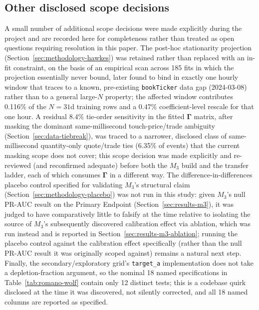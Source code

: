 \subsection{Other disclosed scope decisions}
\label{sec:limitations-other}

A small number of additional scope decisions were made explicitly during
the project and are recorded here for completeness rather than treated
as open questions requiring resolution in this paper. The post-hoc
stationarity projection (Section~\ref{sec:methodology-hawkes}) was
retained rather than replaced with an in-fit constraint, on the basis of
an empirical scan across 185 fits in which the projection essentially
never bound, later found to bind in exactly one hourly window that traces
to a known, pre-existing \texttt{bookTicker} data gap
(2024-03-08) rather than to a general large-$N$ property; the affected
window contributes 0.116\% of the $N=31$d training rows and a $0.47\%$
coefficient-level rescale for that one hour. A residual $8.4\%$
tie-order sensitivity in the fitted $\boldsymbol\Gamma$ matrix, after
masking the dominant same-millisecond touch-price/trade ambiguity
(Section~\ref{sec:data-tiebreak}), was traced to a narrower, disclosed
class of same-millisecond quantity-only quote/trade ties (6.35\% of
events) that the current masking scope does not cover; this scope
decision was made explicitly and re-reviewed (and reconfirmed adequate)
before both the $M_3$ build and the transfer ladder, each of which
consumes $\boldsymbol\Gamma$ in a different way. The difference-in-differences
placebo control specified for validating $M_3$'s structural claim
(Section~\ref{sec:methodology-placebo}) was not run in this study: given
$M_3$'s null PR-AUC result on the Primary Endpoint
(Section~\ref{sec:results-m3}), it was judged to have comparatively
little to falsify at the time relative to isolating the source of $M_3$'s
subsequently discovered calibration effect via ablation, which was run
instead and is reported in Section~\ref{sec:results-m3-ablation}; running
the placebo control against the calibration effect specifically (rather
than the null PR-AUC result it was originally scoped against) remains a
natural next step. Finally, the secondary/exploratory grid's
\texttt{target\_a} implementation does not take a depletion-fraction
argument, so the nominal 18 named specifications in
Table~\ref{tab:romano-wolf} contain only 12 distinct tests; this is a
codebase quirk disclosed at the time it was discovered, not silently
corrected, and all 18 named columns are reported as specified.
